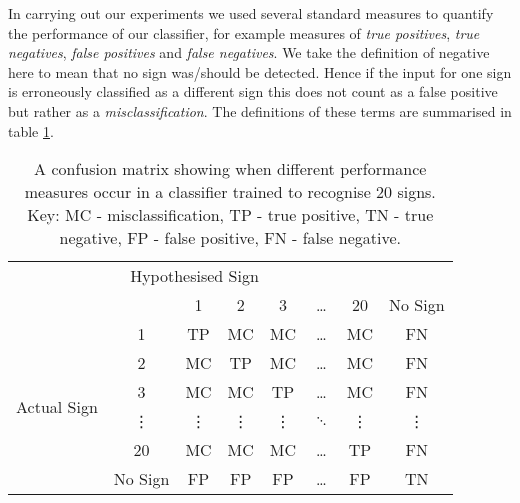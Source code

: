 In carrying out our experiments we used several standard measures to quantify the performance of our classifier, for example measures of \emph{true positives}, \emph{true negatives}, \emph{false positives} and \emph{false negatives}. We take the definition of negative here to mean that no sign was/should be detected. Hence if the input for one sign is erroneously classified as a different sign this does not count as a false positive but rather as a \emph{misclassification}. The definitions of these terms are summarised in table \ref{tab:errors}.
\begin{table}[h!]
  \centering
  \begin{tabular}{c c|c c c c c c}         
\multicolumn{7}{c}{Hypothesised Sign} \\   
    			& & 1 & 2 & 3 & \dots & 20 & No Sign \\
  \hline
\multirow{6}{*}{\begin{sideways} Actual Sign \end{sideways}} &  1 & TP & MC & MC & \dots& MC&FN \\
  &2 		 	& MC & TP & MC & \dots& MC&FN \\
  &3 			& MC & MC & TP & \dots& MC&FN \\
  &\vdots 	& \vdots & \vdots & \vdots& $\ddots$ & \vdots & \vdots \\
  &20 		& MC & MC & MC &  \dots & TP & FN \\
  &No Sign 	& FP & FP & FP & \dots & FP & TN \\

  \end{tabular}
  \caption{A confusion matrix showing when different performance measures occur in a classifier trained to recognise 20 signs. Key: MC - misclassification, TP - true positive, TN - true negative, FP - false positive, FN - false negative. }
  \label{tab:errors}
\end{table}

